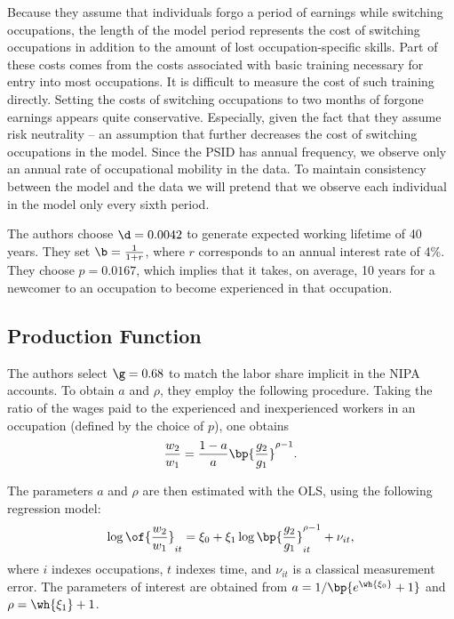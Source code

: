 \documentclass[12pt]{article}
\theoremstyle{definition}
\begin{document}
Because they assume that individuals forgo a period of earnings while switching occupations, the length of the model period represents the cost of switching occupations in addition to the amount of lost occupation-specific skills. Part of these costs comes from the costs associated with basic training necessary for entry into most occupations. It is difficult to measure the cost of such training directly. Setting the costs of switching occupations to two months of forgone earnings appears quite conservative. Especially, given the fact that they assume risk neutrality -- an assumption that further decreases the cost of switching occupations in the model. Since the PSID has annual frequency, we observe only an annual rate of occupational mobility in the data. To maintain consistency between the model and the data we will pretend that we observe each individual in the model only every sixth period.

The authors choose $\d = 0.0042$ to generate expected working lifetime of 40 years. They set $\b = \frac{1}{1+r}$, where $r$ corresponds to an annual interest rate of 4\%. They choose $p = 0.0167$, which implies that it takes, on average, 10 years for a newcomer to an occupation to become experienced in that occupation.

\subsection{Production Function}

The authors select $\g = 0.68$ to match the labor share implicit in the NIPA accounts. To obtain $a$ and $\rho$, they employ the following procedure. Taking the ratio of the wages paid to the experienced and inexperienced workers in an occupation (defined by the choice of $p$), one obtains 
\begin{equation}
	\label{10}
	\frac{w_2}{w_1} = \frac{1-a}{a} \bp{\frac{g_2}{g_1}}^{\rho-1}.
\end{equation}

The parameters $a$ and $\rho$ are then estimated with the OLS, using the following regression model:
\begin{equation}
	\label{11}
	\log\of{\frac{w_2}{w_1}}_{it} = \xi_0 + \xi_1 \log\bp{\frac{g_2}{g_1}}^{\rho-1}_{it} + \nu_{it},
\end{equation}
where $i$ indexes occupations, $t$ indexes time, and $\nu_{it}$ is a classical measurement error. The parameters of interest are obtained from $a = 1/\bp{e^{\wh{\xi_0}}+1}$ and $\rho = \wh{\xi_1} + 1$.
\end{document}
